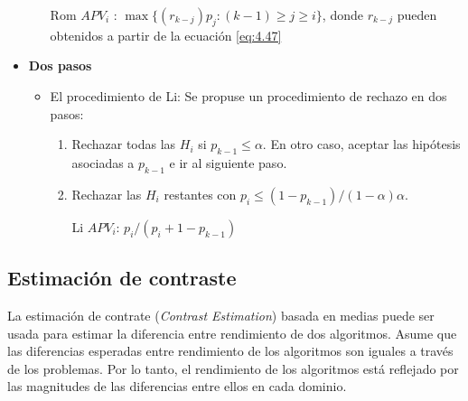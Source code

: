 \begin{itemize}
\begin{itemize}
		Rom $APV_i$ : $\max\{(r_{k-j})p_j : (k-1) \geq j \geq i\}$, donde $r_{k-j}$ pueden obtenidos a partir de la ecuación \ref{eq:4.47}
	\end{itemize}
	
	\item \textbf{Dos pasos}
	\begin{itemize}
		\item El procedimiento de Li: 
		Se propuse un procedimiento de rechazo en dos pasos:
		\begin{enumerate}
			\item Rechazar todas las $H_i$ si $p_{k-1} \leq \alpha$. 
			En otro caso, aceptar las hipótesis asociadas a $p_{k-1}$ e ir al siguiente paso. 
			\item Rechazar las $H_i$ restantes con $p_i \leq (1-p_{k-1})/(1-\alpha)\alpha$.
			
			Li $APV_i$: $p_i/(p_i+1-p_{k-1})$
		\end{enumerate}
	\end{itemize}
\end{itemize}

\subsection{Estimación de contraste}

La estimación de contrate (\textit{Contrast Estimation}) basada en medias puede ser usada para estimar la diferencia entre rendimiento de dos algoritmos. 
Asume que las diferencias esperadas entre rendimiento de los algoritmos son iguales a través de los problemas. 
Por lo tanto, el rendimiento de los algoritmos está reflejado por las magnitudes de las diferencias entre ellos en cada dominio. 

